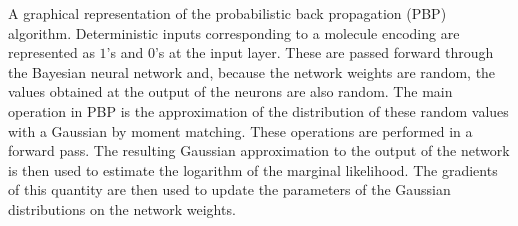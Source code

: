 A graphical representation of the probabilistic back propagation (PBP)
algorithm. Deterministic inputs corresponding to a molecule encoding are represented as $1$'s and $0$'s at the input
layer. These are passed forward through the Bayesian neural network and, because
the network weights are random, the values obtained at the output of the
neurons are also random. The main operation in PBP is the approximation of the
distribution of these random values with a Gaussian by moment matching. These
operations are performed in a forward pass. The resulting Gaussian
approximation to the output of the network is then used to estimate the
logarithm of the marginal likelihood. The gradients of this quantity are then
used to update the parameters of the Gaussian distributions on the network
weights.
\label{fig:pbp}